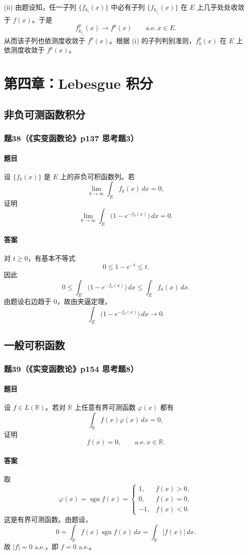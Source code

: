 \documentclass{article}
\newcommand{\R}{\mathbb{R}}
\newcommand{\aee}{\text{a.e.}}
\begin{document}
(ii) 由题设知，任一子列 $\{f_{k_i}(x)\}$ 中必有子列 $\{f_{k_{i_j}}(x)\}$ 在 $E$ 上几乎处处收敛于 $f(x)$。于是
\[
f_{k_{i_j}}^p(x)\to f^p(x)\qquad \aee\ x\in E.
\]
从而该子列也依测度收敛于 $f^p(x)$。根据 (i) 的子列判别准则，$f_k^p(x)$ 在 $E$ 上依测度收敛于 $f^p(x)$。

\section{第四章：Lebesgue 积分}

\subsection{非负可测函数积分}

\subsubsection*{题38（《实变函数论》p137 思考题3）}
\paragraph{题目}设 $\{f_k(x)\}$ 是 $E$ 上的非负可积函数列。若
\[
\lim_{k\to\infty}\int_E f_k(x)\,dx=0,
\]
证明
\[
\lim_{k\to\infty}\int_E\bigl(1-e^{-f_k(x)}\bigr)\,dx=0.
\]

\paragraph{答案}对 $t\ge0$，有基本不等式
\[
0\le 1-e^{-t}\le t.
\]
因此
\[
0\le\int_E\bigl(1-e^{-f_k(x)}\bigr)\,dx
\le\int_E f_k(x)\,dx.
\]
由题设右边趋于 $0$，故由夹逼定理，
\[
\int_E\bigl(1-e^{-f_k(x)}\bigr)\,dx\to0.
\]

\subsection{一般可积函数}

\subsubsection*{题39（《实变函数论》p154 思考题8）}
\paragraph{题目}设 $f\in L(\R)$。若对 $\R$ 上任意有界可测函数 $\varphi(x)$ 都有
\[
\int_{\R}f(x)\varphi(x)\,dx=0,
\]
证明
\[
f(x)=0,
\qquad \aee\ x\in\R.
\]

\paragraph{答案}取
\[
\varphi(x)=\operatorname{sgn} f(x)=
\begin{cases}
1,&f(x)>0,\\
0,&f(x)=0,\\
-1,&f(x)<0.
\end{cases}
\]
这是有界可测函数。由题设，
\[
0=\int_{\R}f(x)\operatorname{sgn} f(x)\,dx
=\int_{\R}|f(x)|\,dx.
\]
故 $|f|=0$ a.e.，即 $f=0$ a.e.。
\end{document}
